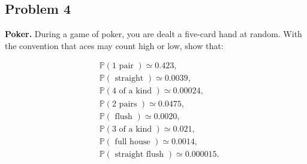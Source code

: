 \documentclass[letterpaper, 11pt]{article}
\newcommand{\1}{\mathds{1}}	%
\theoremstyle{definition}
\begin{document}
\subsection*{Problem 4}
\textbf{Poker.} During a game of poker, you are dealt a five-card hand at random. With the convention that aces may count high or low, show that:

$$\begin{aligned}
& \mathbb{P}(1 \text { pair }) \simeq 0.423, \\
& \mathbb{P}(\text { straight }) \simeq 0.0039, \\
& \mathbb{P}(4 \text { of a kind }) \simeq 0.00024, \\
& \mathbb{P}(2 \text { pairs }) \simeq 0.0475, \\
& \mathbb{P}(\text { flush }) \simeq 0.0020, \\
& \mathbb{P}(3 \text { of a kind }) \simeq 0.021, \\
& \mathbb{P}(\text { full house }) \simeq 0.0014, \\
& \mathbb{P}(\text { straight flush }) \simeq 0.000015 .
\end{aligned}$$
\end{document}
